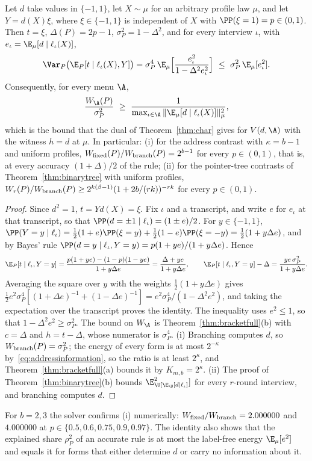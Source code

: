 \begin{proposition}\label{prop:labelnoise}
Let $d$ take values in $\{-1,1\}$, let $X\sim\mu$ for an arbitrary profile law $\mu$, and let $Y=d(X)\xi$, where $\xi\in\{-1,1\}$ is independent of $X$ with $\PP(\xi=1)=p\in(0,1)$. Then $t=\xi$, $\Delta(P)=2p-1$, $\sigma_P^2=1-\Delta^2$, and for every interview $\iota$, with $e_\iota=\E_\mu[d\mid\ell_\iota(X)]$,
\[
 \Var_P\big(\E_P[t\mid\ell_\iota(X),Y]\big)=\sigma_P^4\,\E_\mu\Big[\frac{e_\iota^2}{1-\Delta^2e_\iota^2}\Big]\ \le\ \sigma_P^2\,\E_\mu[e_\iota^2].
\]
Consequently, for every menu $\A$,
\[
 \frac{W_\A(P)}{\sigma_P^2}\ \ge\ \frac1{\max_{\iota\in\A}\|\E_\mu[d\mid\ell_\iota(X)]\|_\mu^2},
\]
which is the bound that the dual of Theorem~\ref{thm:char} gives for $V(d,\A)$ with the witness $h=d$ at $\mu$. In particular:
\textup{(i)} for the address contrast with $\kappa=b-1$ and uniform profiles, $W_{\rm fixed}(P)/W_{\rm branch}(P)=2^{b-1}$ for every $p\in(0,1)$, that is, at every accuracy $(1+\Delta)/2$ of the rule;
\textup{(ii)} for the pointer-tree contrasts of Theorem~\ref{thm:binarytree} with uniform profiles, $W_r(P)/W_{\rm branch}(P)\ge2^{k(\beta-1)}(1+2b/(rk))^{-rk}$ for every $p\in(0,1)$.
\end{proposition}
\begin{proof}
Since $d^2=1$, $t=Yd(X)=\xi$. Fix $\iota$ and a transcript, and write $e$ for $e_\iota$ at that transcript, so that $\PP(d=\pm1\mid\ell_\iota)=(1\pm e)/2$. For $y\in\{-1,1\}$, $\PP(Y=y\mid\ell_\iota)=\tfrac12(1+e)\PP(\xi=y)+\tfrac12(1-e)\PP(\xi=-y)=\tfrac12(1+y\Delta e)$, and by Bayes' rule $\PP(d=y\mid\ell_\iota,Y=y)=p(1+ye)/(1+y\Delta e)$. Hence
\[
 \E_P[t\mid\ell_\iota,Y=y]=\frac{p(1+ye)-(1-p)(1-ye)}{1+y\Delta e}=\frac{\Delta+ye}{1+y\Delta e},
 \qquad
 \E_P[t\mid\ell_\iota,Y=y]-\Delta=\frac{ye\,\sigma_P^2}{1+y\Delta e}.
\]
Averaging the square over $y$ with the weights $\tfrac12(1+y\Delta e)$ gives $\tfrac12e^2\sigma_P^4[(1+\Delta e)^{-1}+(1-\Delta e)^{-1}]=e^2\sigma_P^4/(1-\Delta^2e^2)$, and taking the expectation over the transcript proves the identity. The inequality uses $e^2\le1$, so that $1-\Delta^2e^2\ge\sigma_P^2$. The bound on $W_\A$ is Theorem~\ref{thm:bracketfull}(b) with $c=\Delta$ and $h=t-\Delta$, whose numerator is $\sigma_P^4$.
(i) Branching computes $d$, so $W_{\rm branch}(P)=\sigma_P^2$; the energy of every form is at most $2^{-\kappa}$ by~\eqref{eq:addressinformation}, so the ratio is at least $2^{\kappa}$, and Theorem~\ref{thm:bracketfull}(a) bounds it by $K_{m,b}=2^{\kappa}$. (ii) The proof of Theorem~\ref{thm:binarytree}(b) bounds $\E_\U[\E_\U[d\mid\ell_\iota]^2]$ for every $r$-round interview, and branching computes $d$.
\end{proof}
For $b=2,3$ the solver confirms (i) numerically: $W_{\rm fixed}/W_{\rm branch}=2.000000$ and $4.000000$ at $p\in\{0.5,0.6,0.75,0.9,0.97\}$. The identity also shows that the explained share $\rho_P^2$ of an accurate rule is at most the label-free energy $\E_\mu[e^2]$ and equals it for forms that either determine $d$ or carry no information about it.

